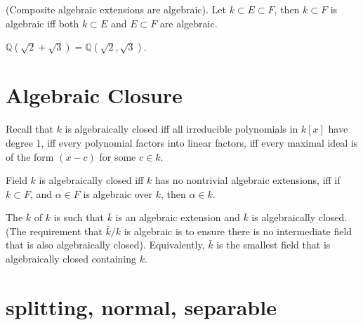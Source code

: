 \documentclass[openany]{book}
\newcommand{\Q}{\mathbb{Q}}
\begin{document}

\begin{prop}
    (Composite algebraic extensions are algebraic). Let $k\subset E\subset F$, then $k\subset F$ is algebraic iff both $k\subset E$ and $E\subset F$ are algebraic.
\end{prop}


\begin{example}
    $\Q(\sqrt{2}+\sqrt{3})=\Q(\sqrt{2},\sqrt{3})$.
\end{example}

\section{Algebraic Closure}

\begin{prop}
    Recall that $k$ is algebraically closed iff all irreducible polynomials in $k[x]$ have degree $1$, iff every polynomial factors into linear factors, iff every maximal ideal is of the form $(x-c)$ for some $c\in k$.
\end{prop}


\begin{prop}
    Field $k$ is algebraically closed iff $k$ has no nontrivial algebraic extensions, iff if $k\subset F$, and $\alpha\in F$ is algebraic over $k$, then $\alpha\in k$.
\end{prop}


\begin{defn}
    The $\bar{k}$ of $k$ is such that $\bar{k}$ is an algebraic extension and $\bar{k}$ is algebraically closed. (The requirement that $\bar{k}/k$ is algebraic is to ensure there is no intermediate field that is also algebraically closed). Equivalently, $\bar{k}$ is the smallest field that is algebraically closed containing $k$.
\end{defn}

\section{splitting, normal, separable}
\end{document}
